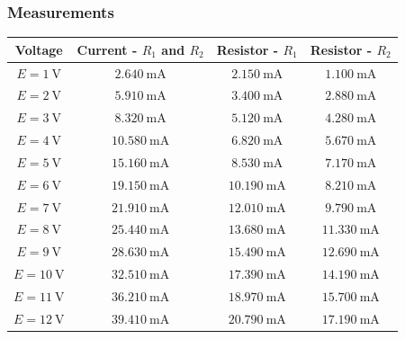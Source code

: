 \documentclass[a4paper]{article}
\begin{document}
\subsubsection{Measurements}
\begin{center}
\begin{tabular}{|c|c|c|c|}
\hline
Voltage & Current - $R_1$ and $R_2$ & Resistor - $R_1$ & Resistor -   $R_2$\\ \hline
$E=\SI{1}{\volt}$ & $\SI{2.640}{\milli\ampere}$ & $\SI{2.150}{\milli\ampere}$ & $\SI{1.100}{\milli\ampere}$ \\ \hline
$E=\SI{2}{\volt}$ & $\SI{5.910}{\milli\ampere}$ & $\SI{3.400}{\milli\ampere}$ & $\SI{2.880}{\milli\ampere}$ \\ \hline
$E=\SI{3}{\volt}$ & $\SI{8.320}{\milli\ampere}$ & $\SI{5.120}{\milli\ampere}$ & $\SI{4.280}{\milli\ampere}$ \\ \hline
$E=\SI{4}{\volt}$ & $\SI{10.580}{\milli\ampere}$ & $\SI{6.820}{\milli\ampere}$ & $\SI{5.670}{\milli\ampere}$ \\ \hline
$E=\SI{5}{\volt}$ & $\SI{15.160}{\milli\ampere}$ & $\SI{8.530}{\milli\ampere}$ & $\SI{7.170}{\milli\ampere}$ \\ \hline
$E=\SI{6}{\volt}$ & $\SI{19.150}{\milli\ampere}$ & $\SI{10.190}{\milli\ampere}$ & $\SI{8.210}{\milli\ampere}$ \\ \hline
$E=\SI{7}{\volt}$ & $\SI{21.910}{\milli\ampere}$ & $\SI{12.010}{\milli\ampere}$ & $\SI{9.790}{\milli\ampere}$ \\ \hline
$E=\SI{8}{\volt}$ & $\SI{25.440}{\milli\ampere}$ & $\SI{13.680}{\milli\ampere}$ & $\SI{11.330}{\milli\ampere}$ \\ \hline
$E=\SI{9}{\volt}$ & $\SI{28.630}{\milli\ampere}$ & $\SI{15.490}{\milli\ampere}$ & $\SI{12.690}{\milli\ampere}$ \\ \hline
$E=\SI{10}{\volt}$ & $\SI{32.510}{\milli\ampere}$ & $\SI{17.390}{\milli\ampere}$ & $\SI{14.190}{\milli\ampere}$ \\ \hline
$E=\SI{11}{\volt}$ & $\SI{36.210}{\milli\ampere}$ & $\SI{18.970}{\milli\ampere}$ & $\SI{15.700}{\milli\ampere}$ \\ \hline
$E=\SI{12}{\volt}$ & $\SI{39.410}{\milli\ampere}$ & $\SI{20.790}{\milli\ampere}$ & $\SI{17.190}{\milli\ampere}$ \\ \hline
\end{tabular}
\end{center}
\end{document}

